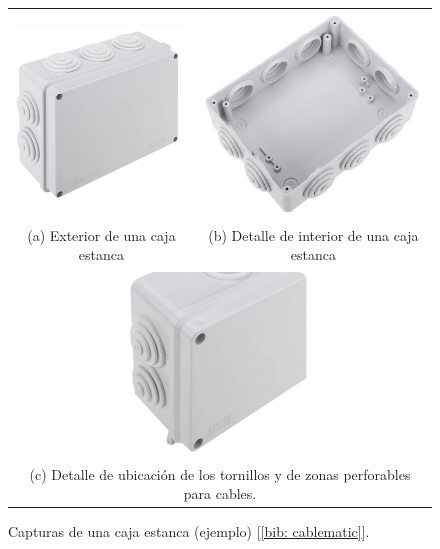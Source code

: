 \documentclass[12pt]{article}
\begin{document}
	\pagebreak
	
	\begin{figure}[h]
		\begin{center}
			\begin{tabular}{cc}
				\includegraphics[width=50mm]{img/caja_estanca_1.png} &   \includegraphics[width=60mm]{img/caja_estanca_2.png} \\
				(a) Exterior de una caja estanca & (b) Detalle de interior de una caja estanca  \\[6pt]
				\multicolumn{2}{c}{\includegraphics[width=50mm]{img/caja_estanca_3.png} }\\
				\multicolumn{2}{c}{(c) Detalle de ubicación de los tornillos y de zonas perforables para cables. }
			\end{tabular}
			\caption{Capturas de una caja estanca (ejemplo) [\ref{bib: cablematic}]. }
			\label{fig: capturas caja estanca}
		\end{center}
	\end{figure}
	
\end{document}
